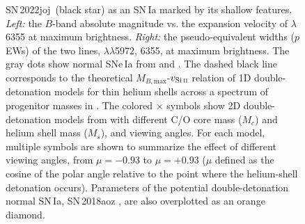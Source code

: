 \documentclass[twocolumn]{aastex631}
\newcommand{\sn}{SN\,2022joj}
\begin{document}
\begin{CJK*}{UTF8}{gbsn}
\begin{figure}
    \caption{\sn\ (black star) as an SN\,Ia marked by its shallow  features. \textit{Left:} the $B$-band absolute magnitude vs. the expansion velocity of  $\lambda$6355 at maximum brightness. \textit{Right:} the pseudo-equivalent widths ($p$EWs) of the two  lines,  $\lambda\lambda$5972, 6355, at maximum brightness. The gray dots show normal SNe\,Ia from \citet{Zheng_2018} and \citet{Burrow_2020}. The dashed black line corresponds to the theoretical $M_{B,\mathrm{max}}$-$v_\mathrm{Si\,\textsc{ii}}$ relation of 1D double-detonation models for thin helium shells across a spectrum of progenitor masses in \citet{polin_observational_2019}. The colored $\times$ symbols show 2D double-detonation models from \citet{Shen_2D_2021} with different C/O core mass ($M_c$) and helium shell mass ($M_s$), and viewing angles. For each model, multiple symbols are shown to summarize the effect of different viewing angles, from $\mu = -0.93$ to $\mu=+0.93$ ($\mu$ defined as the cosine of the polar angle relative to the point where the helium-shell detonation occurs). Parameters of the potential double-detonation normal SN\,Ia, SN\,2018aoz \citep{Ni_18aoz_2023}, are also overplotted as an orange diamond.}
    \label{fig:phase_space}
\end{figure}


\end{CJK*}
\end{document}
